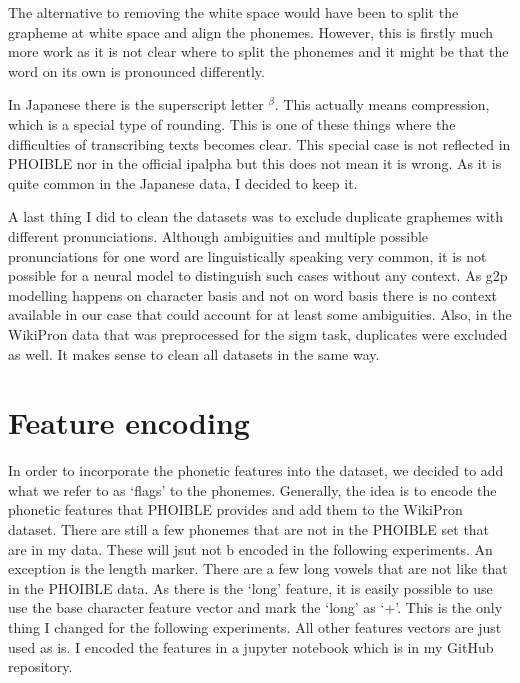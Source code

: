 The alternative to removing the white space would have been to split the grapheme at white space and align the phonemes. However, this is firstly much more work as it is not clear where to split the phonemes and it might be that the word on its own is pronounced differently. 

In Japanese there is the superscript letter $^\beta$. This actually means compression, which is a special type of rounding. This is one of these things where the difficulties of transcribing texts becomes clear. This special case is not reflected in PHOIBLE nor in the official \ac{ipalpha} but this does not mean it is wrong. As it is quite common in the Japanese data, I decided to keep it.

A last thing I did to clean the datasets was to exclude duplicate graphemes with different pronunciations. Although ambiguities and multiple possible pronunciations for one word are linguistically speaking very common, it is not possible for a neural model to distinguish such cases without any context. As \ac{g2p} modelling happens on character basis and not on word basis there is no context available in our case that could account for at least some ambiguities. Also, in the WikiPron data that was preprocessed for the \ac{sigm} task, duplicates were excluded as well. It makes sense to clean all datasets in the same way.


\section{Feature encoding}
\label{sec:feature_enc}
In order to incorporate the phonetic features into the dataset, we decided to add what we refer to as `flags' to the phonemes. Generally, the idea is to encode the phonetic features that PHOIBLE provides and add them to the WikiPron dataset.  There are still a few phonemes that are not in the PHOIBLE set that are in my data. These will jsut not b encoded in the following experiments. An exception is the length marker. There are a few long vowels that are not like that in the PHOIBLE data. As there is the `long' feature, it is easily possible to use use the base character feature vector and mark the `long' as `+'. This is the only thing I changed for the following experiments. All other features vectors are just used as is. I encoded the features in a jupyter notebook which is in my GitHub repository.

